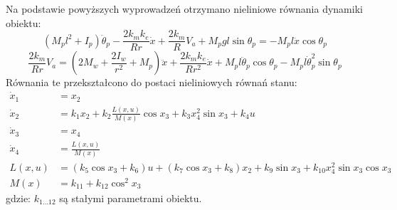 Na podstawie powyższych wyprowadzeń otrzymano nieliniowe równania dynamiki obiektu:
\begin{equation}
(M_pl^2+I_p)\ddot \theta_p-\frac{2k_mk_e}{Rr}\dot{x}+\frac{2k_m}{R}V_a+M_pgl\sin \theta_p=-M_pl\ddot x\cos \theta_p
\end{equation}
\begin{equation}
\frac{2k_m}{Rr}V_a=(2M_w+\frac{2I_w}{r^2}+M_p)\ddot x+\frac{2k_mk_e}{Rr^2}\dot x+M_pl\ddot \theta_p\cos \theta_p-M_pl\dot \theta_p^2\sin \theta_p
\end{equation}
Równania te przekształcono do postaci nieliniowych równań stanu:
\begin{equation}
\begin{aligned}
\dot x_1 &= x_2\\
\dot x_2 &= k_1x_2+k_2\frac{L(x,u)}{M(x)}\cos x_3+k_3x_4^2\sin x_3+k_4u\\
\dot x_3 &= x_4\\
\dot x_4 &= \frac{L(x,u)}{M(x)}\\
L(x,u) &= (k_5\cos x_3+k_6)u+(k_7\cos x_3+k_8)x_2+k_9\sin x_3+k_{10}x_4^2\sin x_3\cos x_3\\
M(x) &= k_{11}+k_{12}\cos ^2x_3
\end{aligned}
\label{eq:nonlinear_ss}
\end{equation}
\noindent gdzie:\newline
\(k_{1\dots 12}\) są stałymi parametrami obiektu.

